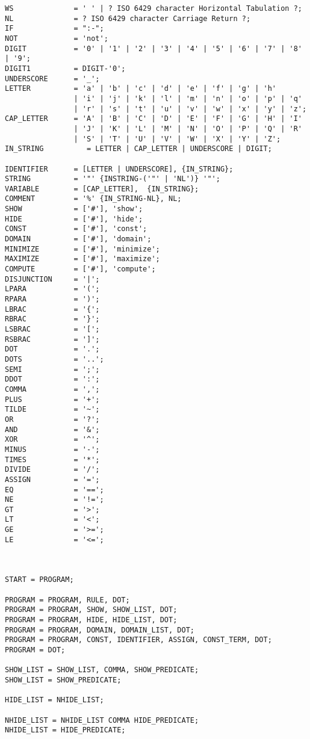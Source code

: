 		
\begin{verbatim}
WS              = ' ' | ? ISO 6429 character Horizontal Tabulation ?;
NL              = ? ISO 6429 character Carriage Return ?;
IF              = ":-";
NOT             = 'not';
DIGIT           = '0' | '1' | '2' | '3' | '4' | '5' | '6' | '7' | '8' | '9';
DIGIT1          = DIGIT-'0';
UNDERSCORE      = '_';
LETTER          = 'a' | 'b' | 'c' | 'd' | 'e' | 'f' | 'g' | 'h'
                | 'i' | 'j' | 'k' | 'l' | 'm' | 'n' | 'o' | 'p' | 'q'
                | 'r' | 's' | 't' | 'u' | 'v' | 'w' | 'x' | 'y' | 'z';
CAP_LETTER      = 'A' | 'B' | 'C' | 'D' | 'E' | 'F' | 'G' | 'H' | 'I'
                | 'J' | 'K' | 'L' | 'M' | 'N' | 'O' | 'P' | 'Q' | 'R'
                | 'S' | 'T' | 'U' | 'V' | 'W' | 'X' | 'Y' | 'Z';
IN_STRING          = LETTER | CAP_LETTER | UNDERSCORE | DIGIT;

IDENTIFIER      = [LETTER | UNDERSCORE], {IN_STRING};
STRING          = '"' {INSTRING-('"' | 'NL')} '"';
VARIABLE        = [CAP_LETTER],  {IN_STRING};
COMMENT         = '%' {IN_STRING-NL}, NL;
SHOW            = ['#'], 'show';
HIDE            = ['#'], 'hide';
CONST           = ['#'], 'const';
DOMAIN          = ['#'], 'domain';
MINIMIZE        = ['#'], 'minimize';
MAXIMIZE        = ['#'], 'maximize';
COMPUTE         = ['#'], 'compute';
DISJUNCTION     = '|';
LPARA           = '(';
RPARA           = ')';
LBRAC           = '{';
RBRAC           = '}';
LSBRAC          = '[';
RSBRAC          = ']';
DOT             = '.';
DOTS            = '..';
SEMI            = ';';
DDOT            = ':';
COMMA           = ',';
PLUS            = '+';
TILDE           = '~';
OR              = '?';
AND             = '&';
XOR             = '^';
MINUS           = '-';
TIMES           = '*';
DIVIDE          = '/';
ASSIGN          = '=';
EQ              = '==';
NE              = '!=';
GT              = '>';
LT              = '<';
GE              = '>=';
LE              = '<=';



START = PROGRAM;

PROGRAM = PROGRAM, RULE, DOT;
PROGRAM = PROGRAM, SHOW, SHOW_LIST, DOT;
PROGRAM = PROGRAM, HIDE, HIDE_LIST, DOT;
PROGRAM = PROGRAM, DOMAIN, DOMAIN_LIST, DOT;
PROGRAM = PROGRAM, CONST, IDENTIFIER, ASSIGN, CONST_TERM, DOT;
PROGRAM = DOT;

SHOW_LIST = SHOW_LIST, COMMA, SHOW_PREDICATE;
SHOW_LIST = SHOW_PREDICATE;

HIDE_LIST = NHIDE_LIST;

NHIDE_LIST = NHIDE_LIST COMMA HIDE_PREDICATE;
NHIDE_LIST = HIDE_PREDICATE;


\end{verbatim}

